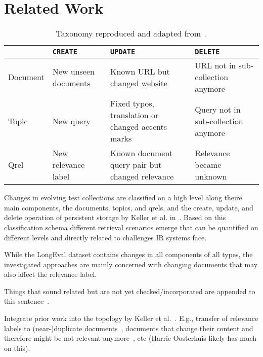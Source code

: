 \section{Related Work}


\begin{table}
    \caption{Taxonomy reproduced and adapted from~\cite{keller:2024}.}
    \label{tab:CRUD}
    \begin{tabularx}{\linewidth}{l | X | X | X}
        \toprule
        {}       & \texttt{CREATE}          & \texttt{UPDATE}                 & \texttt{DELETE} \\ \midrule
        Document & New unseen documents     & Known URL but changed website   & URL not in sub-collection anymore              \\\midrule
        Topic    & New query                & Fixed typos, translation or changed accents marks                               & Query not in sub-collection anymore \\\midrule
        Qrel     & New relevance label      & Known document query pair but changed relevance & Relevance became unknown   \\\bottomrule
    \end{tabularx}
\end{table}

Changes in evolving test collections are classified on a high level along theire main components, the documents, topics, and qrels, and the create, update, and delete operation of persistent storage by Keller et al. in~\cite{keller:2024}. Based on this classification schema different retrieval scenarios emerge that can be quantified on different levels and directly related to challenges IR systems face.


While the LongEval dataset contains changes in all components of all types, the investigated approaches are mainly concerned with changing documents that may also affect the relevance label.



Things that sound related but are not yet checked/incorporated are appended to this sentence~\cite{li:2022}.

Integrate prior work into the topology by Keller et al.~\cite{keller:2024}. E.g., transfer of relevance labels to (near-)duplicate documents~\cite{froebe:2021a}, documents that change their content and therefore might be not relevant anymore~\cite{froebe:2022d}, etc (Harrie Oosterhuis likely has much on this).

